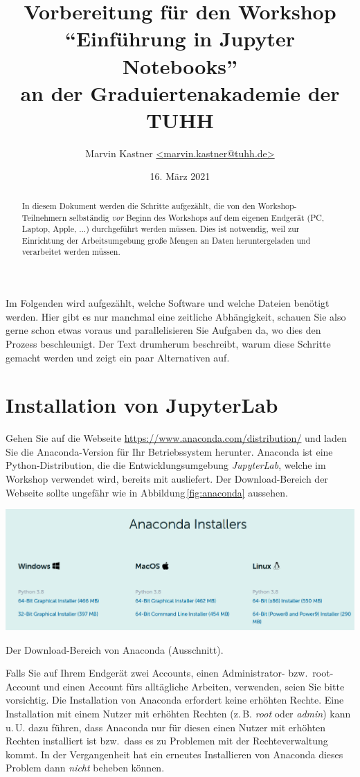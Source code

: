 \documentclass{tufte-handout}
\title{Vorbereitung für den Workshop\\
 \enquote{Einführung in Jupyter Notebooks}\\
 an der Graduiertenakademie der TUHH}
\author{Marvin Kastner \href{mailto:marvin.kastner@tuhh.de}{<marvin.kastner@tuhh.de>}}
\date{16. März 2021} %
\begin{document}
\maketitle%

\begin{abstract}
\noindent
In diesem Dokument werden die Schritte aufgezählt, die von den Workshop-Teilnehmern selbständig \emph{vor} Beginn des Workshops auf dem eigenen Endgerät (PC, Laptop, Apple, ...) durchgeführt werden müssen.
Dies ist notwendig, weil zur Einrichtung der Arbeitsumgebung große Mengen an Daten heruntergeladen und verarbeitet werden müssen.
\end{abstract}

Im Folgenden wird aufgezählt, welche Software und welche Dateien benötigt werden.
Hier gibt es nur manchmal eine zeitliche Abhängigkeit, schauen Sie also gerne schon etwas voraus und parallelisieren Sie Aufgaben da, wo dies den Prozess beschleunigt.
Der Text drumherum beschreibt, warum diese Schritte gemacht werden und zeigt ein paar Alternativen auf.


\section{Installation von JupyterLab}

Gehen Sie auf die Webseite
\url{https://www.anaconda.com/distribution/} 
und laden Sie die Anaconda-Version für Ihr Betriebssystem herunter.
Anaconda ist eine Python-Distribution, die die Entwicklungsumgebung \emph{JupyterLab}, welche im Workshop verwendet wird, bereits mit ausliefert.
Der Download-Bereich der Webseite sollte ungefähr wie in Abbildung\,\ref{fig:anaconda} aussehen.

\begin{marginfigure}
  \includegraphics{anaconda}
  \caption{Der Download-Bereich von Anaconda (Ausschnitt).}%
\label{fig:anaconda}
\end{marginfigure}

Falls Sie auf Ihrem Endgerät zwei Accounts, einen Administrator- bzw.\ root-Account und einen Account fürs alltägliche Arbeiten, verwenden, seien Sie bitte vorsichtig.
Die Installation von Anaconda erfordert keine erhöhten Rechte.
Eine Installation mit einem Nutzer mit erhöhten Rechten (z.\,B. \emph{root} oder \emph{admin}) kann u.\,U. dazu führen, dass Anaconda nur für diesen einen Nutzer mit erhöhten Rechten installiert ist bzw.\ dass es zu Problemen mit der Rechteverwaltung kommt.
In der Vergangenheit hat ein erneutes Installieren von Anaconda dieses Problem dann \emph{nicht} beheben können.
\end{document}
